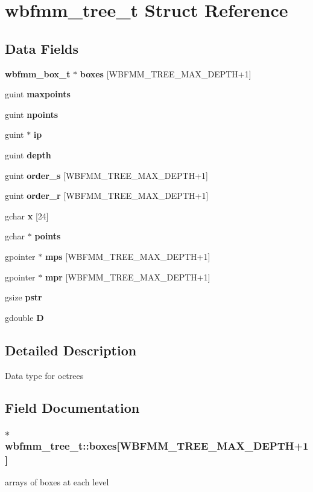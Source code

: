 \section{wbfmm\+\_\+tree\+\_\+t Struct Reference}
\label{structwbfmm__tree__t}
\subsection*{Data Fields}
\begin{DoxyCompactItemize}
\item 
{\bf wbfmm\+\_\+box\+\_\+t} $\ast$ {\bf boxes} [W\+B\+F\+M\+M\+\_\+\+T\+R\+E\+E\+\_\+\+M\+A\+X\+\_\+\+D\+E\+P\+T\+H+1]
\item 
guint {\bf maxpoints}
\item 
guint {\bf npoints}
\item 
guint $\ast$ {\bf ip}
\item 
guint {\bf depth}
\item 
guint {\bf order\+\_\+s} [W\+B\+F\+M\+M\+\_\+\+T\+R\+E\+E\+\_\+\+M\+A\+X\+\_\+\+D\+E\+P\+T\+H+1]
\item 
guint {\bf order\+\_\+r} [W\+B\+F\+M\+M\+\_\+\+T\+R\+E\+E\+\_\+\+M\+A\+X\+\_\+\+D\+E\+P\+T\+H+1]
\item 
gchar {\bf x} [24]
\item 
gchar $\ast$ {\bf points}
\item 
gpointer $\ast$ {\bf mps} [W\+B\+F\+M\+M\+\_\+\+T\+R\+E\+E\+\_\+\+M\+A\+X\+\_\+\+D\+E\+P\+T\+H+1]
\item 
gpointer $\ast$ {\bf mpr} [W\+B\+F\+M\+M\+\_\+\+T\+R\+E\+E\+\_\+\+M\+A\+X\+\_\+\+D\+E\+P\+T\+H+1]
\item 
gsize {\bf pstr}
\item 
gdouble {\bf D}
\end{DoxyCompactItemize}


\subsection{Detailed Description}
Data type for octrees 

\subsection{Field Documentation}
\subsubsection[{boxes}]{$\ast$ wbfmm\+\_\+tree\+\_\+t\+::boxes[W\+B\+F\+M\+M\+\_\+\+T\+R\+E\+E\+\_\+\+M\+A\+X\+\_\+\+D\+E\+P\+T\+H+1]}\label{structwbfmm__tree__t_a2cec33cf396af727261fdb357e2a4de2}
arrays of boxes at each level 

